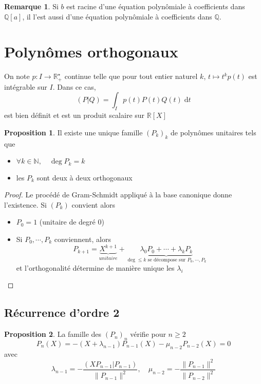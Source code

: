 \documentclass{article}
\theoremstyle{definition}
\newtheorem*{rem}{Remarque}
\newtheorem*{prop}{Proposition}
\begin{document}
\begin{rem}
Si $b$ est racine d'une équation polynômiale à coefficients dans $\mathbb Q[a]$, il l'est aussi d'une équation polynômiale à coefficients dans $\mathbb Q$.
\end{rem}

\section{Polynômes orthogonaux}

On note $p: I\longrightarrow \mathbb R_+^\star$ continue telle que pour tout entier naturel $k$, $t\longmapsto t^kp(t)$ est intégrable sur $I$. Dans ce cas, \[
    (P|Q)=\int_Ip(t)P(t)Q(t)\;\mathrm dt
\]
est bien définit et est un produit scalaire sur $\mathbb R[X]$

\begin{prop}
Il existe une unique famille $(P_k)_k$ de polynômes unitaires tels que
\begin{itemize}
    \item $\forall k\in\mathbb N, \quad \deg P_k=k$
    \item les $P_k$ sont deux à deux orthogonaux
\end{itemize}
\end{prop}

\begin{proof}
Le procédé de Gram-Schmidt appliqué à la base canonique donne l'existence. Si $(P_k)$ convient alors
\begin{itemize}
    \item $P_0=1$ (unitaire de degré $0$)
    \item Si $P_0, \cdots, P_k$ conviennent, alors \[
        P_{k+1}=\underbrace{X^{k+1}}_{unitaire} + \underbrace{\lambda_0P_0+\cdots +\lambda_k P_k}_{\deg \leq k \text{ se décompose sur }P_0, \cdots, P_k}
    \]
et l'orthogonalité détermine de manière unique les $\lambda_i$
\end{itemize}
\end{proof}

\subsection{Récurrence d'ordre 2}

\begin{prop}
La famille des $(P_n)_n$ vérifie pour $n\geq 2$ \[
    P_n(X)=-(X+\lambda_{n-1})P_{n-1}(X)-\mu_{n-2}P_{n-2}(X)=0
\]
avec \[
    \lambda_{n-1}=-\frac{(XP_{n-1}|P_{n-1})}{\|P_{n-1}\|^2}, \quad \mu_{n-2}=-\frac{\|P_{n-1}\|^2}{\|P_{n-2}\|^2}
\]
\end{prop}
\end{document}
